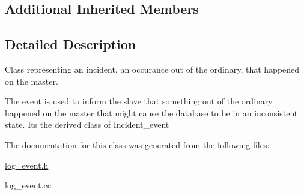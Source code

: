 \subsection*{Additional Inherited Members}


\subsection{Detailed Description}
Class representing an incident, an occurance out of the ordinary, that happened on the master.

The event is used to inform the slave that something out of the ordinary happened on the master that might cause the database to be in an inconsistent state. Its the derived class of Incident\+\_\+event 

The documentation for this class was generated from the following files\+:\begin{DoxyCompactItemize}
\item 
\mbox{\hyperlink{log__event_8h}{log\+\_\+event.\+h}}\item 
log\+\_\+event.\+cc\end{DoxyCompactItemize}

